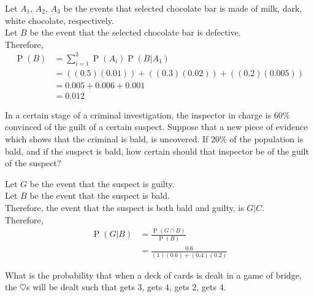 \documentclass[titlepage, fleqn, a4paper, 12pt, twoside]{article}
\theoremstyle{definition}
\theoremstyle{theorem}
\DeclareMathOperator{\prob}{\mathrm{P}}
\newcommand{\A}{\text{Alice}\xspace}
\newcommand{\B}{\text{Bob}\xspace}
\newcommand{\C}{\text{Charlie}\xspace}
\newcommand{\D}{\text{David}\xspace}
\begin{document}
\begin{solution}
	Let $A_1$, $A_2$, $A_3$ be the events that selected chocolate bar is made of milk, dark, white chocolate, respectively.\\
	Let $B$ be the event that the selected chocolate bar is defective.\\
	Therefore,
	\begin{align*}
		\prob(B) & = \sum\limits_{i = 1}^{3} \prob(A_i) \prob(B|A_1)                                          \\
                         & = \left( (0.5) (0.01) \right) + \left( (0.3) (0.02) \right) + \left( (0.2) (0.005) \right) \\
                         & = 0.005 + 0.006 + 0.001                                                                    \\
                         & = 0.012
	\end{align*}
\end{solution}

\begin{question}
	In a certain stage of a criminal investigation, the inspector in charge is $60\%$ convinced of the guilt of a certain suspect.
	Suppose that a new piece of evidence which shows that the criminal is bald, is uncovered.
	If $20\%$ of the population is bald, and if the suspect is bald, how certain should that inspector be of the guilt of the suspect?
\end{question}

\begin{solution}
	Let $G$ be the event that the suspect is guilty.\\
	Let $B$ be the event that the suspect is bald.\\
	Therefore, the event that the suspect is both bald and guilty, is $G|C$.\\
	Therefore,
	\begin{align*}
		\prob(G|B) & = \frac{\prob(G \cap B)}{\prob(B)} \\
                           & = \frac{0.6}{(1) (0.6) + (0.4) (0.2)}
	\end{align*}
\end{solution}

\begin{question}
	What is the probability that when a deck of cards is dealt in a game of bridge, the $\heartsuit$s will be dealt such that \A gets $3$, \B gets $4$, \C gets $2$, \D gets $4$.
\end{question}
\end{document}
